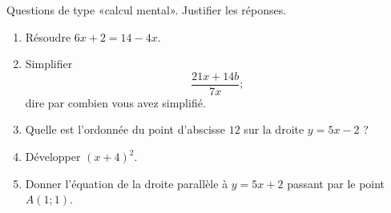 
\begin{exercice}[\ldots/4]\label{exosmath-0699}

    Questions de type «calcul mental». Justifier les réponses.
    \begin{multicols}{2}
    \begin{enumerate}
        \item
            Résoudre $6x+2=14-4x$.
        \item
            Simplifier
            \begin{equation}
                \frac{ 21x+14b }{ 7x };
            \end{equation}
            dire par combien vous avez simplifié.
        \item
            Quelle est l'ordonnée du point d'abscisse \( 12\) sur la droite \( y=5x-2\) ?
        \item
            Développer \( (x+4)^2\).
        \item
            Donner l'équation de la droite parallèle à \( y=5x+2\) passant par le point \( A(1;1)\).
    \end{enumerate}
    \end{multicols}

\end{exercice}
